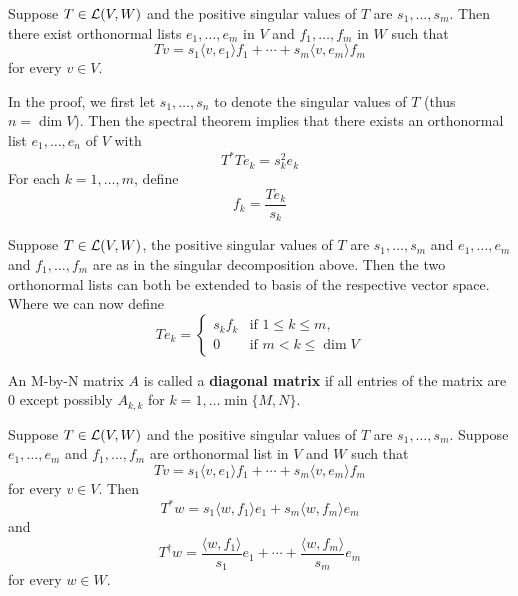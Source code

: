 \documentclass{extarticle}
\begin{document}
\begin{thm}[\textcolor{red}{SINGULAR VALUE DECOMPOSITION}]
    Suppose \(T \in \mathcal{L}(V, W)\) and the positive singular values of \(T\) are \(s_1, \ldots, s_m\). 
    Then there exist orthonormal lists \(e_1, \ldots, e_m\) in \(V\) and \(f_1, \ldots, f_m\) in \(W\)
    such that 
    \[Tv = s_1 \langle v,e_1 \rangle f_1 + \cdots + s_m \langle v,e_m \rangle f_m\]
    for every \(v \in V\).
\end{thm}


\begin{remark}
    In the proof, we first let \(s_1, \ldots, s_n\) to denote the singular values of \(T\) (thus 
    \(n = \dim V\)). Then the spectral theorem implies that there exists an orthonormal list \(e_1, \ldots, e_n\)
    of \(V\) with 
    \[T^* T e_k = s_k^2 e_k\]
    For each \(k = 1, \ldots, m\), define 
    \[f_k = \frac{T e_k}{s_k}\]
\end{remark}

\begin{remark}
    Suppose \(T \in \mathcal{L}(V, W)\), the positive singular values of \(T\) are \(s_1, \ldots, s_m\) 
    and \(e_1, \ldots, e_m\) and \(f_1, \ldots, f_m\) are as in the singular decomposition above. 
    Then the two orthonormal lists can both be extended to basis of the respective vector space.  Where 
    we can now define 
    \[Te_k = \begin{cases}
        s_k f_k &\text{if } 1 \leq k \leq m, \\ 
        0 &\text{if } m < k \leq \dim V
    \end{cases}\]
\end{remark}


\begin{definition}
    An M-by-N matrix \(A\) is called a \textbf{diagonal matrix} if all entries of the matrix are 0 
    except possibly \(A_{k, k}\) for \(k = 1, \ldots \min \{M, N\}\).
\end{definition}

\begin{thm}
    Suppose \(T \in \mathcal{L}(V, W)\) and the positive singular values of \(T\) are 
    \(s_1, \ldots, s_m\). Suppose \(e_1, \ldots, e_m\) and \(f_1, \ldots, f_m\) are orthonormal 
    list in \(V\) and \(W\) such that 
    \[Tv = s_1 \langle v,e_1 \rangle f_1 + \cdots + s_m \langle v,e_m \rangle f_m\]
    for every \(v \in V\). Then 
    \[T^*w = s_1 \langle w,f_1 \rangle e_1 + s_m \langle w,f_m \rangle e_m\]
    and 
    \[T^\dagger w = \frac{\langle w,f_1 \rangle}{s_1}e_1 + \cdots + \frac{\langle w,f_m \rangle}{s_m}e_m\]
    for every \(w \in W\).
\end{thm}
\end{document}
